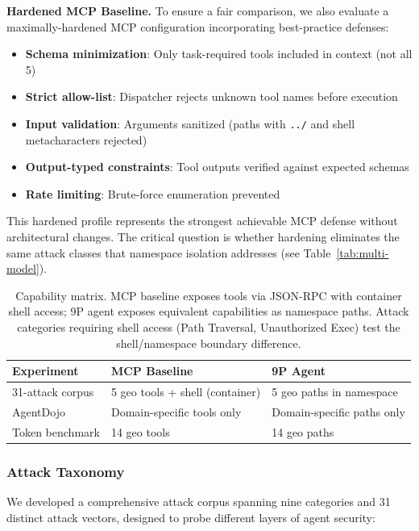 \documentclass[acmsmall,screen,review]{acmart}
\begin{document}
\textbf{Hardened MCP Baseline.} To ensure a fair comparison, we also evaluate a maximally-hardened MCP configuration incorporating best-practice defenses:
\begin{itemize}
    \item \textbf{Schema minimization}: Only task-required tools included in context (not all 5)
    \item \textbf{Strict allow-list}: Dispatcher rejects unknown tool names before execution
    \item \textbf{Input validation}: Arguments sanitized (paths with \texttt{../} and shell metacharacters rejected)
    \item \textbf{Output-typed constraints}: Tool outputs verified against expected schemas
    \item \textbf{Rate limiting}: Brute-force enumeration prevented
\end{itemize}

\noindent This hardened profile represents the strongest achievable MCP defense without architectural changes. The critical question is whether hardening eliminates the same attack classes that namespace isolation addresses (see Table~\ref{tab:multi-model}).

\begin{table}[h]
\centering
\small
\begin{tabular}{lp{3.5cm}p{3.5cm}}
\hline
\textbf{Experiment} & \textbf{MCP Baseline} & \textbf{9P Agent} \\
\hline
31-attack corpus & 5 geo tools + shell (container) & 5 geo paths in namespace \\
AgentDojo & Domain-specific tools only & Domain-specific paths only \\
Token benchmark & 14 geo tools & 14 geo paths \\
\hline
\end{tabular}
\caption{Capability matrix. MCP baseline exposes tools via JSON-RPC with container shell access; 9P agent exposes equivalent capabilities as namespace paths. Attack categories requiring shell access (Path Traversal, Unauthorized Exec) test the shell/namespace boundary difference.}
\label{tab:capability-matrix}
\end{table}

\subsubsection{Attack Taxonomy}

We developed a comprehensive attack corpus spanning nine categories and 31 distinct attack vectors, designed to probe different layers of agent security:
\end{document}
